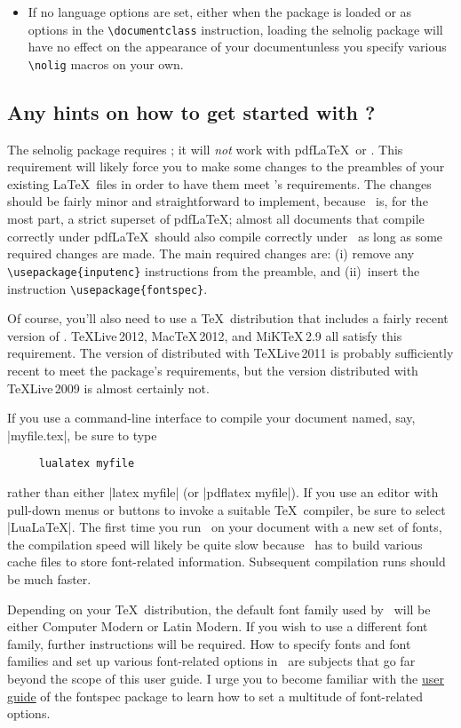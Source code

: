 \documentclass[12pt]{article}
\newcommand{\pkg}[1]{\textsf{#1}}
\newcommand{\cmmd}[1]{\texttt{\textbackslash #1}}
\begin{document}
\begin{itemize}
\item If no language options are set, either when the package is loaded or as options in the \cmmd{documentclass} instruction, loading the \pkg{selnolig} package will have no effect on the appearance of your document\textemdash unless you specify various \cmmd{nolig} macros on your own.
\end{itemize}


\subsection{Any hints on how to get started with \LuaLaTeX?}

The \pkg{selnolig} package requires \LuaLaTeX; it will \emph{not} work with pdf\LaTeX\ or \XeLaTeX. This requirement will likely force you to make some changes to the preambles of your existing \LaTeX\ files in order to have them meet \LuaLaTeX's requirements. The changes should be fairly minor and straightforward to implement, because \LuaLaTeX\ is, for the most part, a strict superset of pdf\LaTeX; almost all documents that compile correctly under pdf\LaTeX\ should also compile correctly under \LuaLaTeX\ as long as some required changes are made.
The main required changes are: (i) remove any \Verb+\usepackage{inputenc}+ instructions from the preamble, and (ii)~insert the instruction
\Verb+\usepackage{fontspec}+.

Of course, you'll also need to use a \TeX\ distribution that includes a fairly recent version of \LuaLaTeX. \TeX Live\,2012, Mac\TeX\,2012, and MiK\TeX\,2.9 all satisfy this requirement. The version of \LuaLaTeX distributed with TeXLive\,2011 is probably sufficiently recent to meet the package's requirements, but the version distributed with TeXLive\,2009 is almost certainly not. 

If you use a command-line interface to compile your document named, say, |myfile.tex|, be sure to type 
\begin{Verbatim}
     lualatex myfile
\end{Verbatim}
rather than either |latex myfile| (or |pdflatex myfile|). If you use an editor with pull-down menus or buttons to invoke a suitable \TeX\ compiler, be sure to select |LuaLaTeX|. The first time you run \LuaLaTeX\ on your document with a new set of fonts, the compilation speed will likely be quite slow because \LuaLaTeX\ has to build various cache files to store font-related information. Subsequent compilation runs should be much faster. 

Depending on your \TeX\ distribution, the default font family used by \LuaLaTeX\ will be either Computer Modern or Latin Modern. If you wish to use a different font family, further instructions will be required. How to specify fonts and font families and set up various font-related options in \LuaLaTeX\ are subjects that go far beyond the scope of this user guide. I urge you to become familiar with the \href{http://www.ctan.org/tex-archive/macros/latex/contrib/fontspec/fontspec.pdf}{user guide} of the \pkg{fontspec} package to learn how to set a multitude of font-related options.
\end{document}
